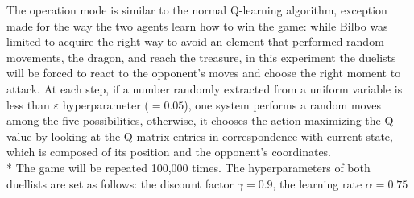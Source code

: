 The operation mode is similar to the normal Q-learning algorithm, exception made for the way the two agents learn how to win the game: while Bilbo was limited to acquire the right way to avoid an element that performed random movements, the dragon, and reach the treasure, in this experiment the duelists will be forced to react to the opponent's moves and choose the right moment to attack. At each step, if a number randomly extracted from a uniform variable is less than $\varepsilon$ hyperparameter ($=0.05$), one system performs a random moves among the five possibilities, otherwise, it chooses the action maximizing the Q-value by looking at the Q-matrix entries in correspondence with current state, which is composed of its position and the opponent's coordinates.\\*
The game will be repeated 100,000 times. The hyperparameters of both duellists are set as follows: the discount factor $\gamma = 0.9$, the learning rate $\alpha = 0.75$

